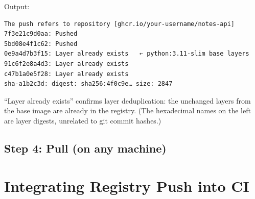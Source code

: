 \noindent{}Output:

\begin{outputbox}[short]
\begin{Verbatim}[fontsize=\codesize, breaklines, breakanywhere, breaksymbolleft={\tiny\textcolor{muted}{$\hookrightarrow$}}]
The push refers to repository [ghcr.io/your-username/notes-api]
7f3e21c9d0aa: Pushed
5bd08e4f1c62: Pushed
0e9a4d7b3f15: Layer already exists   ← python:3.11-slim base layers
91c6f2e8a4d3: Layer already exists
c47b1a0e5f28: Layer already exists
sha-a1b2c3d: digest: sha256:4f0c9e… size: 2847
\end{Verbatim}
\end{outputbox}

\noindent{}``Layer already exists'' confirms layer deduplication: the unchanged layers from the base image are already in the registry. (The hexadecimal names on the left are layer digests, unrelated to git commit hashes.)

\subsection*{Step 4: Pull (on any machine)}\label{19-artifact-storage:step-4-pull-on-any-machine}

\begin{codebox}[short]

\begin{Shaded}
\begin{Highlighting}[]
 \DataTypeTok{\textbackslash{}}
  \DataTypeTok{\textbackslash{}}
  \DataTypeTok{\textbackslash{}}
  \DataTypeTok{\textbackslash{}}
\end{Highlighting}
\end{Shaded}

\end{codebox}

\setcounter{section}{3}
\section{Integrating Registry Push into CI}\label{19-artifact-storage:194-integrating-registry-push-into-ci}

